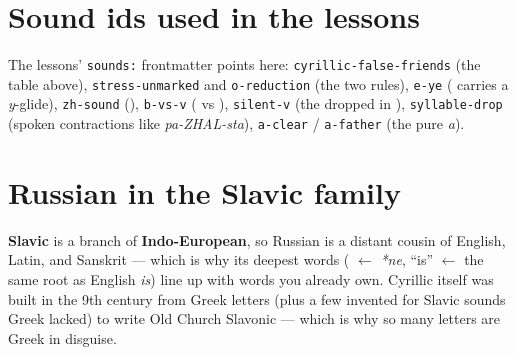 \section*{Sound ids used in the lessons}

The lessons' \texttt{sounds:} frontmatter points here: \texttt{cyrillic-false-friends} (the table above), \texttt{stress-unmarked} and \texttt{o-reduction} (the two rules), \texttt{e-ye} ( carries a \emph{y}-glide), \texttt{zh-sound} (), \texttt{b-vs-v} ( vs ), \texttt{silent-v} (the dropped  in \emph{}), \texttt{syllable-drop} (spoken contractions like \emph{pa-ZHAL-sta}), \texttt{a-clear} / \texttt{a-father} (the pure \emph{a}).

\section*{Russian in the Slavic family}

\textbf{Slavic} is a branch of \textbf{Indo-European}, so Russian is a distant cousin of English, Latin, and Sanskrit — which is why its deepest words (\emph{} $\leftarrow$ \emph{*ne}, \emph{} \textquotedblleft{}is\textquotedblright{} $\leftarrow$ the same root as English \emph{is}) line up with words you already own. Cyrillic itself was built in the 9th century from Greek letters (plus a few invented for Slavic sounds Greek lacked) to write Old Church Slavonic — which is why so many letters are Greek in disguise.
